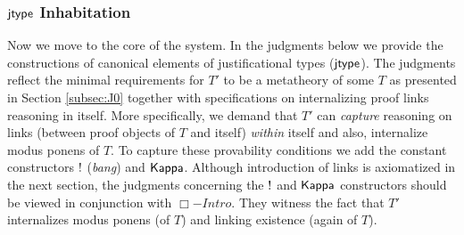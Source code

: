 {\subsubsection{${\sf jtype}$ Inhabitation}




Now we move to the core of the system. In the judgments below we provide the constructions of canonical elements of justificational types (${\sf jtype}$). The judgments reflect  the minimal requirements for $T'$ to be a metatheory of some $T$ as presented  in Section \ref{subsec:J0} together with specifications on internalizing proof links reasoning in itself. More specifically, we demand that $T'$ can \textit{capture} reasoning on links (between proof objects of $T$ and itself) \textit {within} itself and also, internalize modus ponens of $T$.  To capture these provability conditions we add the constant constructors ${\sf !}$ (\textit{bang}) and  ${\sf Kappa}$. Although introduction of links is axiomatized in the next section, the judgments concerning the ${\sf !}$ and ${\sf Kappa}$ constructors should be viewed in conjunction with $\Box-Intro$. They witness the fact that $T'$ internalizes modus ponens (of $T$)  and linking existence  (again of $T$).  






}

